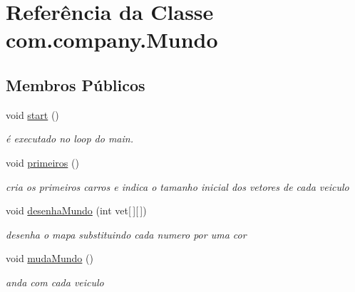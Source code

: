 \hypertarget{classcom_1_1company_1_1_mundo}{}\section{Referência da Classe com.\+company.\+Mundo}
\label{classcom_1_1company_1_1_mundo}
\subsection*{Membros Públicos}
\begin{DoxyCompactItemize}
\item 
\mbox{\label{classcom_1_1company_1_1_mundo_a4a84d2b83fe16d469f53c5722b185f51}} 
void \mbox{\hyperlink{classcom_1_1company_1_1_mundo_a4a84d2b83fe16d469f53c5722b185f51}{start}} ()
\begin{DoxyCompactList}\small\item\em é executado no loop do main. \end{DoxyCompactList}\item 
\mbox{\label{classcom_1_1company_1_1_mundo_a179987e05cb0feb829ebf0d04ea5e2f4}} 
void \mbox{\hyperlink{classcom_1_1company_1_1_mundo_a179987e05cb0feb829ebf0d04ea5e2f4}{primeiros}} ()
\begin{DoxyCompactList}\small\item\em cria os primeiros carros e indica o tamanho inicial dos vetores de cada veiculo \end{DoxyCompactList}\item 
void \mbox{\hyperlink{classcom_1_1company_1_1_mundo_a68c0d4a026816da24da3055edb712e43}{desenha\+Mundo}} (int vet\mbox{[}$\,$\mbox{]}\mbox{[}$\,$\mbox{]})
\begin{DoxyCompactList}\small\item\em desenha o mapa substituindo cada numero por uma cor \end{DoxyCompactList}\item 
\mbox{\label{classcom_1_1company_1_1_mundo_af544ee726301f78e4266776a07719870}} 
void \mbox{\hyperlink{classcom_1_1company_1_1_mundo_af544ee726301f78e4266776a07719870}{muda\+Mundo}} ()
\begin{DoxyCompactList}\small\item\em anda com cada veiculo \end{DoxyCompactList}\item 

\end{DoxyCompactItemize}
